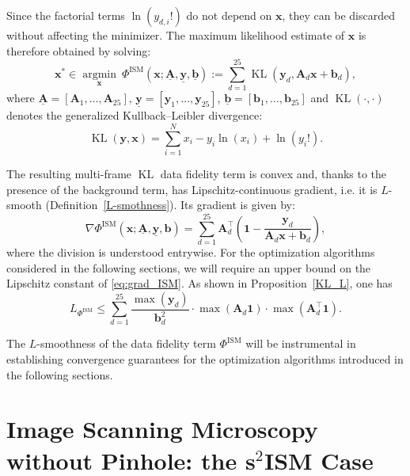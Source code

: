 \documentclass[letterpaper]{article}
\newcommand{\x}{\mathbf{x}}
\newcommand{\A}{\mathbf{A}}
\newcommand{\y}{\mathbf{y}}
\begin{document}
Since the factorial terms $\ln(y_{d,i}!)$ do not depend on $\x$, they can be discarded without affecting the minimizer. The maximum likelihood estimate of $\x$ is therefore obtained by solving:
\begin{equation}
\label{ml_min}
\x^*
\in
\operatorname*{argmin}_{\x}
~
\Phi^{\text{ISM}}(\x;\underline{\mathbf{A}}, \underline{\mathbf{y}}, \underline{\mathbf{b}})
:=
\sum_{d=1}^{25}
\operatorname{KL}(\mathbf{y}_d,\A_d\x+\mathbf{b}_d),
\end{equation}
where
$\underline{\A} = [\A_1,\dots,\A_{25}]$,
$\underline{\y} = [\y_1,\dots,\y_{25}]$, $\underline{\mathbf{b}} = [ \mathbf{b}_1, \dots, \mathbf{b}_{25}]$
and $\operatorname{KL}(\cdot,\cdot)$ denotes the generalized Kullback--Leibler divergence:
\[
\operatorname{KL}(\y,\x)
=
\sum_{i=1}^{N}
x_i
-
y_i \ln(x_i)
+
\ln(y_i!).
\]

The resulting multi-frame $\operatorname{KL}$ data fidelity term is convex and, thanks to the presence of the background term, has Lipschitz-continuous gradient, i.e. it is $L$-smooth (Definition~\ref{L-smothness}). Its gradient is given by:
\begin{equation}
\label{eq:grad_ISM}
\nabla \Phi^{\text{ISM}}(\x;\underline{\A},\underline{\y},\mathbf{b})
=
\sum_{d=1}^{25}
\A_d^\top
\left(
\mathbf{1}
-
\frac{\y_d}{\A_d\x+\mathbf{b}_d}
\right),
\end{equation}
where the division is understood entrywise. For the optimization algorithms considered in the following sections, we will require an upper bound on the Lipschitz constant of \eqref{eq:grad_ISM}. As shown in Proposition~\ref{KL_L}, one has
\begin{equation}
L_{\Phi^{\text{ISM}}}
\leq
\sum_{d=1}^{25}
\frac{\max(\mathbf{y}_d)}{\mathbf{b}_d^2}
\cdot
\max(\A_d \mathbf{1})
\cdot
\max(\A_d^\top \mathbf{1}).
\end{equation}

The $L$-smoothness of the data fidelity term $\Phi^{\text{ISM}}$ will be instrumental in establishing convergence guarantees for the optimization algorithms introduced in the following sections.


\section{Image Scanning Microscopy without Pinhole: the s$^2$ISM Case}
\end{document}
